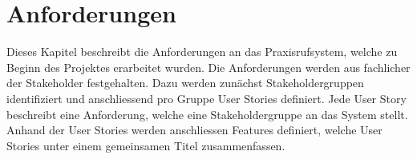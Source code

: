 \section{Anforderungen}\label{sec:anforderungen}

Dieses Kapitel beschreibt die Anforderungen an das Praxisrufsystem, welche zu Beginn des Projektes erarbeitet wurden.
Die Anforderungen werden aus fachlicher der Stakeholder festgehalten.
Dazu werden zunächst Stakeholdergruppen identifiziert und anschliessend pro Gruppe User Stories definiert.
Jede User Story beschreibt eine Anforderung, welche eine Stakeholdergruppe an das System stellt.
Anhand der User Stories werden anschliessen Features definiert, welche User Stories unter einem gemeinsamen Titel zusammenfassen.



